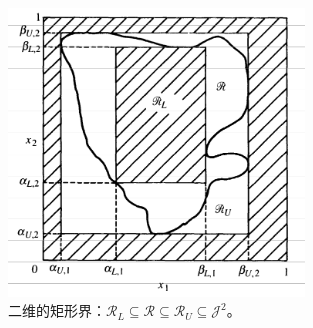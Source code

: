 \begin{figure}[!ht]
\centering
\includegraphics[width=0.7\textwidth]{images/hyperrectangle.png}
\caption{二维的矩形界：$\mathscr{R}_L \subseteq \mathscr{R} \subseteq
  \mathscr{R}_U \subseteq \mathscr{J}^2$。}
\label{fig::hyperrectangle2D}
\end{figure}

